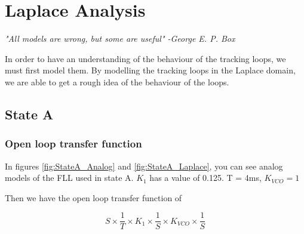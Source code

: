 \label{ch:LaplaceAnalysis}
\chapter{Laplace Analysis}

\emph{"All models are wrong, but some are useful" -George E. P. Box}


\begin{table}[!htb]
\caption{Test inputs for evaluating errors \cite{Nise}}
\label{tab:LaplaceTestInputs}
\end{table}






In order to have an understanding of the behaviour of the tracking loops, we must first model them. By modelling the tracking loops in the Laplace domain, we are able to get a rough idea of the behaviour of the loops. 

\section{State A}
\subsection{Open loop transfer function}
In figures \ref{fig:StateA_Analog} and \ref{fig:StateA_Laplace}, you can see analog models of the FLL used in state A. $K_1$ has a value of 0.125. T = 4ms, $K_{VCO} = 1$

Then we have the open loop transfer function of 

\begin{equation}
S \times \frac{1}{T} \times K_1 \times \frac{1}{S} \times  
K_{VCO} \times \frac{1}{S}
\end{equation}

